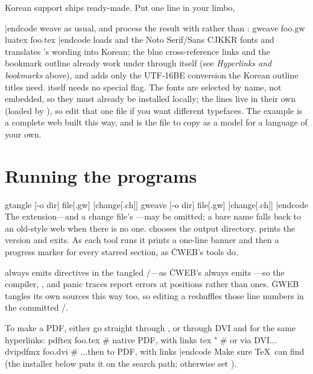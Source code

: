 Korean support ships ready-made. Put one line in your limbo,
\begincode

|endcode
weave as usual, and process the result with  rather than :
\begincode
gweave foo.gw
luatex foo.tex
|endcode
 loads  and the Noto Serif/Sans CJK\thinspace KR
fonts and translates 's wording into Korean; the blue cross-reference
links and the bookmark outline already work under  through
 itself (see {\it Hyperlinks and bookmarks\/} above), and
 adds only the UTF-16BE conversion the Korean outline titles
need.  itself needs no special flag. The
fonts are selected by name, not embedded, so they must already be installed
locally; the  lines live in their own 
(loaded by ), so edit that one file if you want different
typefaces. The  example is a complete web built this
way, and  is the file to copy as a model for a language of
your own.

\chapter{Running the programs}
\begincode
gtangle [-o dir] file[.gw] [change[.ch]]
gweave  [-o dir] file[.gw] [change[.ch]]
|endcode
The  extension---and a change file's ---may be omitted; a bare
name falls back to an old-style  web when there is no  one.
 chooses the output directory.  prints the version and exits.
As each tool runs it prints a one-line banner and then a  progress
marker for every starred section, as \.{CWEB}'s tools do.

 always emits  directives in the tangled \GO/---as \.{CWEB}'s
 always emits ---so the compiler, , and panic
traces report errors at  positions rather than  ones. \.{GWEB} tangles
its own sources this way too, so editing a  reshuffles those line numbers
in the committed \GO/.

To make a PDF, either go straight through , or through DVI and
 for the same hyperlinks:
\begincode
pdftex foo.tex                       # native PDF, with links
tex "\let\pdf+        # or via DVI...
dvipdfmx foo.dvi                     # ...then to PDF, with links
|endcode
Make sure \TeX\ can find  (the installer below puts it on the
search path; otherwise set ).

